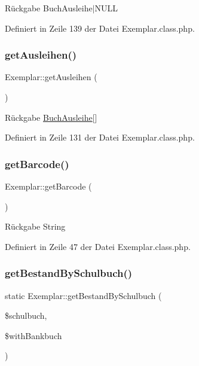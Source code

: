 \begin{DoxyReturn}{Rückgabe}
Buch\+Ausleihe$\vert$\+N\+U\+LL 
\end{DoxyReturn}


Definiert in Zeile 139 der Datei Exemplar.\+class.\+php.

\mbox{\label{class_exemplar_a5f8f9bfa004e153aa958672c938dece9}} 
\subsubsection{\texorpdfstring{get\+Ausleihen()}{getAusleihen()}}
{\footnotesize\ttfamily Exemplar\+::get\+Ausleihen (\begin{DoxyParamCaption}{ }\end{DoxyParamCaption})}

\begin{DoxyReturn}{Rückgabe}
\mbox{\hyperlink{class_buch_ausleihe}{Buch\+Ausleihe}}\mbox{[}\mbox{]} 
\end{DoxyReturn}


Definiert in Zeile 131 der Datei Exemplar.\+class.\+php.

\mbox{\label{class_exemplar_ab87886d72f44247d1399b7010bf83e77}} 
\subsubsection{\texorpdfstring{get\+Barcode()}{getBarcode()}}
{\footnotesize\ttfamily Exemplar\+::get\+Barcode (\begin{DoxyParamCaption}{ }\end{DoxyParamCaption})}

\begin{DoxyReturn}{Rückgabe}
String 
\end{DoxyReturn}


Definiert in Zeile 47 der Datei Exemplar.\+class.\+php.

\mbox{\label{class_exemplar_a8d1c60ff17290739c77bf2c17cec4ff7}} 
\subsubsection{\texorpdfstring{get\+Bestand\+By\+Schulbuch()}{getBestandBySchulbuch()}}
{\footnotesize\ttfamily static Exemplar\+::get\+Bestand\+By\+Schulbuch (\begin{DoxyParamCaption}\item[{}]{\$schulbuch,  }\item[{}]{\$with\+Bankbuch }\end{DoxyParamCaption})\hspace{0.3cm}{\ttfamily [static]}}



